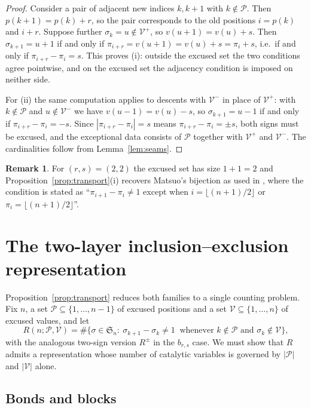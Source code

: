 \documentclass[11pt]{article}
\theoremstyle{definition}
\newtheorem{remark}[theorem]{Remark}
\newcommand{\Sn}{\mathfrak{S}_n}
\newcommand{\brs}{b_{r,s}}
\begin{document}
\begin{proof}
Consider a pair of adjacent new indices $k,k+1$ with $k\notin\mathcal{P}$. Then
$p(k+1)=p(k)+r$, so the pair corresponds to the old positions $i=p(k)$ and
$i+r$. Suppose further $\sigma_k=u\notin\mathcal{V}^{+}$, so $v(u+1)=v(u)+s$.
Then $\sigma_{k+1}=u+1$ if and only if
$\pi_{i+r}=v(u+1)=v(u)+s=\pi_i+s$, i.e.\ if and only if
$\pi_{i+r}-\pi_i=s$. This proves (i): outside the excused set the two
conditions agree pointwise, and on the excused set the adjacency condition is
imposed on neither side.

For (ii) the same computation applies to descents with $\mathcal{V}^{-}$ in
place of $\mathcal{V}^{+}$: with $k\notin\mathcal{P}$ and
$u\notin\mathcal{V}^{-}$ we have $v(u-1)=v(u)-s$, so $\sigma_{k+1}=u-1$ if and
only if $\pi_{i+r}-\pi_i=-s$. Since $|\pi_{i+r}-\pi_i|=s$ means
$\pi_{i+r}-\pi_i=\pm s$, both signs must be excused, and the exceptional data
consists of $\mathcal{P}$ together with $\mathcal{V}^{+}$ and $\mathcal{V}^{-}$.
The cardinalities follow from Lemma~\ref{lem:seams}.
\end{proof}

\begin{remark}
For $(r,s)=(2,2)$ the excused set has size $1+1=2$ and
Proposition~\ref{prop:transport}(i) recovers Matsuo's bijection as used in
\cite{SZ}, where the condition is stated as ``$\pi_{i+1}-\pi_i\neq 1$ except
when $i=\lfloor (n+1)/2\rfloor$ or $\pi_i=\lfloor (n+1)/2\rfloor$''.
\end{remark}

\section{The two-layer inclusion--exclusion representation}\label{sec:rep}

Proposition~\ref{prop:transport} reduces both families to a single counting
problem. Fix $n$, a set $\mathcal{P}\subseteq\{1,\dots,n-1\}$ of excused
positions and a set $\mathcal{V}\subseteq\{1,\dots,n\}$ of excused values, and
let
\[
  R(n;\mathcal{P},\mathcal{V})
  = \#\bigl\{\sigma\in\Sn :\ \sigma_{k+1}-\sigma_k\neq 1
    \ \text{ whenever } k\notin\mathcal{P} \text{ and } \sigma_k\notin\mathcal{V}\bigr\},
\]
with the analogous two-sign version $R^{\pm}$ in the $\brs$ case. We must show
that $R$ admits a representation whose number of catalytic variables is
governed by $|\mathcal{P}|$ and $|\mathcal{V}|$ alone.

\subsection*{Bonds and blocks}
\end{document}
